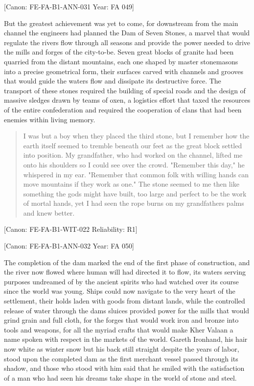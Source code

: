 {[}Canon: FE-FA-B1-ANN-031 \textbar{} Year: FA 049{]}

But the greatest achievement was yet to come, for downstream from the
main channel the engineers had planned the Dam of Seven Stones, a marvel
that would regulate the river\textquotesingle s flow through all seasons
and provide the power needed to drive the mills and forges of the
city-to-be. Seven great blocks of granite had been quarried from the
distant mountains, each one shaped by master stonemasons into a precise
geometrical form, their surfaces carved with channels and grooves that
would guide the water\textquotesingle s flow and dissipate its
destructive force. The transport of these stones required the building
of special roads and the design of massive sledges drawn by teams of
oxen, a logistics effort that taxed the resources of the entire
confederation and required the cooperation of clans that had been
enemies within living memory.

\begin{quote}
I was but a boy when they placed the third stone, but I remember how the
earth itself seemed to tremble beneath our feet as the great block
settled into position. My grandfather, who had worked on the channel,
lifted me onto his shoulders so I could see over the crowd. "Remember
this day," he whispered in my ear. "Remember that common folk with
willing hands can move mountains if they work as one." The stone seemed
to me then like something the gods might have built, too large and
perfect to be the work of mortal hands, yet I had seen the rope burns on
my grandfather\textquotesingle s palms and knew better.
\end{quote}

{[}Canon: FE-FA-B1-WIT-022 \textbar{} Reliability: R1{]}

{[}Canon: FE-FA-B1-ANN-032 \textbar{} Year: FA 050{]}

The completion of the dam marked the end of the first phase of
construction, and the river now flowed where human will had directed it
to flow, its waters serving purposes undreamed of by the ancient spirits
who had watched over its course since the world was young. Ships could
now navigate to the very heart of the settlement, their holds laden with
goods from distant lands, while the controlled release of water through
the dam\textquotesingle s sluices provided power for the mills that
would grind grain and full cloth, for the forges that would work iron
and bronze into tools and weapons, for all the myriad crafts that would
make Kher Valaan a name spoken with respect in the markets of the world.
Gareth Ironhand, his hair now white as winter snow but his back still
straight despite the years of labor, stood upon the completed dam as the
first merchant vessel passed through its shadow, and those who stood
with him said that he smiled with the satisfaction of a man who had seen
his dreams take shape in the world of stone and steel.

